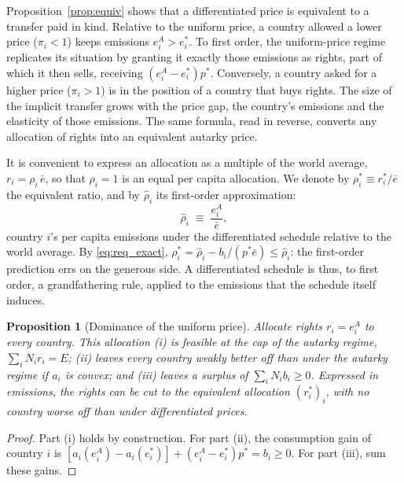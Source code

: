 \documentclass[12pt,english]{article}
\newtheorem{proposition}{Proposition}
\theoremstyle{remark}
\begin{document}
Proposition~\ref{prop:equiv} shows that a differentiated price is equivalent to a transfer paid in kind. Relative to the uniform price, a country allowed a lower price ($\pi_i<1$) keeps emissions $e^A_i>e^*_i$. To first order, the uniform-price regime replicates its situation by granting it exactly those emissions as rights, part of which it then sells, receiving $(e^A_i-e^*_i)p^*$. Conversely, a country asked for a higher price ($\pi_i>1$) is in the position of a country that buys rights. The size of the implicit transfer grows with the price gap, the country's emissions and the elasticity of those emissions. The same formula, read in reverse, converts any allocation of rights into an equivalent autarky price.

It is convenient to express an allocation as a multiple of the world average, $r_i=\rho_i\,\bar e$, so that $\rho_i=1$ is an equal per capita allocation. We denote by $\rho^*_i\equiv r^*_i/\bar e$ the equivalent ratio, and by $\hat\rho_i$ its first-order approximation:
\begin{equation}
  \hat\rho_i \;\equiv\; \frac{e^A_i}{\bar e},
  \label{eq:rhohat_static}
\end{equation}
country $i$'s per capita emissions under the differentiated schedule relative to the world average. By \eqref{eq:req_exact}, $\rho^*_i=\hat\rho_i-b_i/(p^*\bar e)\le\hat\rho_i$: the first-order prediction errs on the generous side. A differentiated schedule is thus, to first order, a grandfathering rule, applied to the emissions that the schedule itself induces.

\begin{proposition}[Dominance of the uniform price]\label{prop:dominance}
Allocate rights $r_i=e^A_i$ to every country. This allocation (i) is feasible at the cap of the autarky regime, $\sum_i N_i r_i=E$; (ii) leaves every country weakly better off than under the autarky regime %
if $a_i$ is convex; %
and (iii) leaves a surplus of $\sum_i N_i b_i\geq 0$. Expressed in emissions, the rights can be cut %
to the equivalent allocation $(r^*_i)_i$, with no country worse off than under differentiated prices.
\end{proposition}

\begin{proof}
Part (i) holds by construction. For part (ii), the consumption gain of country $i$ is $[a_i(e^A_i)-a_i(e^*_i)]+(e^A_i-e^*_i)p^*=b_i\geq0$. For part (iii), sum these gains. 
\end{proof}
\end{document}
